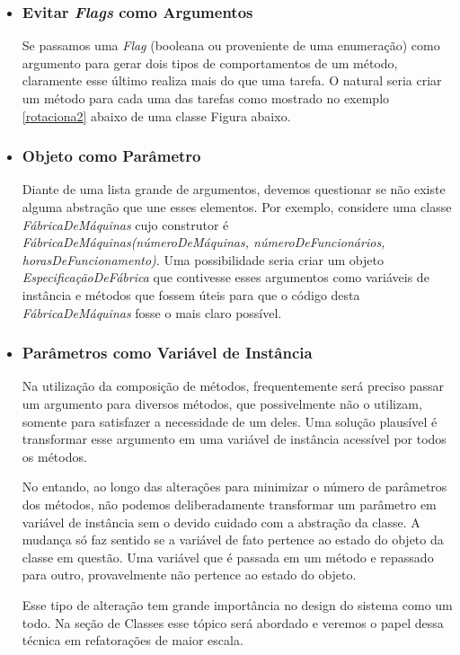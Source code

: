 \begin{itemize}
\item
\subsubsection{Evitar \textit{Flags} como Argumentos}
Se passamos uma \textit{Flag} (booleana ou proveniente de uma enumeração) como argumento para gerar dois tipos de comportamentos de um método, claramente esse último realiza mais do que uma tarefa. O natural seria criar um método para cada uma das tarefas como mostrado no exemplo \ref{rotaciona2} abaixo de uma classe Figura abaixo.




\item
\subsubsection{Objeto como Parâmetro}
Diante de uma lista grande de argumentos, devemos questionar se não existe alguma abstração que une esses elementos. Por exemplo, considere uma classe \textit{FábricaDeMáquinas} cujo construtor é \textit{FábricaDeMáquinas(númeroDeMáquinas, númeroDeFuncionários, horasDeFuncionamento)}. Uma possibilidade seria criar um objeto \textit{EspecificaçãoDeFábrica} que contivesse esses argumentos como variáveis de instância e métodos que fossem úteis para que o código desta \textit{FábricaDeMáquinas} fosse o mais claro possível.

\item
\subsubsection{Parâmetros como Variável de Instância}
\label{metodos:parametros}
Na utilização da composição de métodos, frequentemente será preciso passar um argumento para diversos métodos, que 
possivelmente não o utilizam, somente para satisfazer a necessidade de um deles. Uma solução plausível é transformar esse 
argumento em uma variável de instância acessível por todos os métodos.

No entando, ao longo das alterações para minimizar o número de parâmetros dos métodos, não podemos
deliberadamente transformar um parâmetro em variável de instância sem o devido cuidado
com a abstração da classe. A mudança só faz sentido se a variável de fato pertence ao 
estado do objeto da classe em questão. Uma variável que é passada em um método e repassado
para outro, provavelmente não pertence ao estado do objeto.

Esse tipo de alteração tem grande importância no design do sistema como um todo. Na seção de Classes esse tópico será abordado e veremos o papel dessa técnica em refatorações de maior escala.
\end{itemize}

